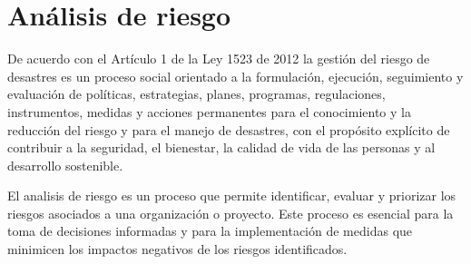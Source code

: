\section{Análisis de riesgo}
De acuerdo con el Artículo 1 de la Ley 1523 de 2012 la gestión del riesgo de desastres es un proceso social orientado a la formulación, ejecución, seguimiento y evaluación de políticas, estrategias, planes, programas, regulaciones, instrumentos, medidas y acciones permanentes para el conocimiento y la reducción del riesgo y para el manejo de desastres, con el propósito explícito de contribuir a la seguridad, el bienestar, la calidad de vida de las personas y al desarrollo sostenible. 

El analisis de riesgo es un proceso que permite identificar, evaluar y priorizar los riesgos asociados a una organización o proyecto. Este proceso es esencial para la toma de decisiones informadas y para la implementación de medidas que minimicen los impactos negativos de los riesgos identificados.









